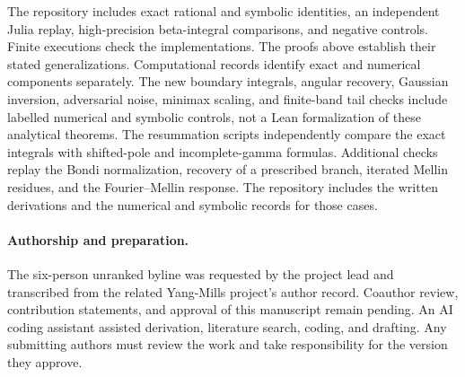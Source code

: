 \documentclass[11pt]{article}
\theoremstyle{remark}\newtheorem{remark}[theorem]{Remark}
\begin{document}
The repository includes exact rational and symbolic identities, an independent Julia replay, high-precision beta-integral comparisons, and negative controls. Finite executions check the implementations. The proofs above establish their stated generalizations. Computational records identify exact and numerical components separately. The new boundary integrals, angular recovery, Gaussian inversion, adversarial noise, minimax scaling, and finite-band tail checks include labelled numerical and symbolic controls, not a Lean formalization of these analytical theorems. The resummation scripts independently compare the exact integrals with shifted-pole and incomplete-gamma formulas. Additional checks replay the Bondi normalization, recovery of a prescribed branch, iterated Mellin residues, and the Fourier--Mellin response. The repository includes the written derivations and the numerical and symbolic records for those cases.

\paragraph{Authorship and preparation.}
The six-person unranked byline was requested by the project lead and transcribed from the related Yang-Mills project's author record. Coauthor review, contribution statements, and approval of this manuscript remain pending. An AI coding assistant assisted derivation, literature search, coding, and drafting. Any submitting authors must review the work and take responsibility for the version they approve.
\end{document}
